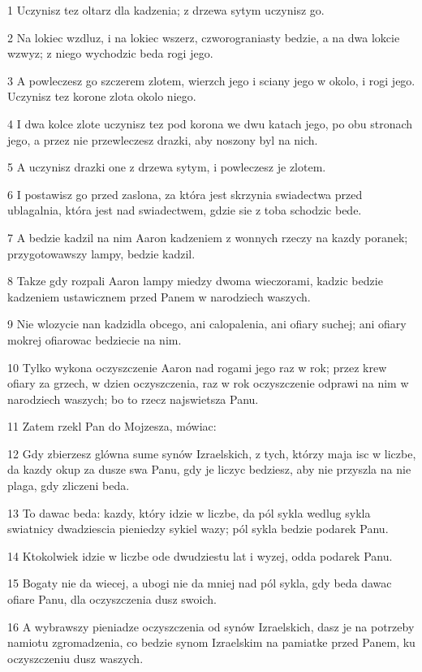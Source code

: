 \par 1 Uczynisz tez oltarz dla kadzenia; z drzewa sytym uczynisz go.
\par 2 Na lokiec wzdluz, i na lokiec wszerz, czworograniasty bedzie, a na dwa lokcie wzwyz; z niego wychodzic beda rogi jego.
\par 3 A powleczesz go szczerem zlotem, wierzch jego i sciany jego w okolo, i rogi jego. Uczynisz tez korone zlota okolo niego.
\par 4 I dwa kolce zlote uczynisz tez pod korona we dwu katach jego, po obu stronach jego, a przez nie przewleczesz drazki, aby noszony byl na nich.
\par 5 A uczynisz drazki one z drzewa sytym, i powleczesz je zlotem.
\par 6 I postawisz go przed zaslona, za która jest skrzynia swiadectwa przed ublagalnia, która jest nad swiadectwem, gdzie sie z toba schodzic bede.
\par 7 A bedzie kadzil na nim Aaron kadzeniem z wonnych rzeczy na kazdy poranek; przygotowawszy lampy, bedzie kadzil.
\par 8 Takze gdy rozpali Aaron lampy miedzy dwoma wieczorami, kadzic bedzie kadzeniem ustawicznem przed Panem w narodziech waszych.
\par 9 Nie wlozycie nan kadzidla obcego, ani calopalenia, ani ofiary suchej; ani ofiary mokrej ofiarowac bedziecie na nim.
\par 10 Tylko wykona oczyszczenie Aaron nad rogami jego raz w rok; przez krew ofiary za grzech, w dzien oczyszczenia, raz w rok oczyszczenie odprawi na nim w narodziech waszych; bo to rzecz najswietsza Panu.
\par 11 Zatem rzekl Pan do Mojzesza, mówiac:
\par 12 Gdy zbierzesz glówna sume synów Izraelskich, z tych, którzy maja isc w liczbe, da kazdy okup za dusze swa Panu, gdy je liczyc bedziesz, aby nie przyszla na nie plaga, gdy zliczeni beda.
\par 13 To dawac beda: kazdy, który idzie w liczbe, da pól sykla wedlug sykla swiatnicy dwadziescia pieniedzy sykiel wazy; pól sykla bedzie podarek Panu.
\par 14 Ktokolwiek idzie w liczbe ode dwudziestu lat i wyzej, odda podarek Panu.
\par 15 Bogaty nie da wiecej, a ubogi nie da mniej nad pól sykla, gdy beda dawac ofiare Panu, dla oczyszczenia dusz swoich.
\par 16 A wybrawszy pieniadze oczyszczenia od synów Izraelskich, dasz je na potrzeby namiotu zgromadzenia, co bedzie synom Izraelskim na pamiatke przed Panem, ku oczyszczeniu dusz waszych.
